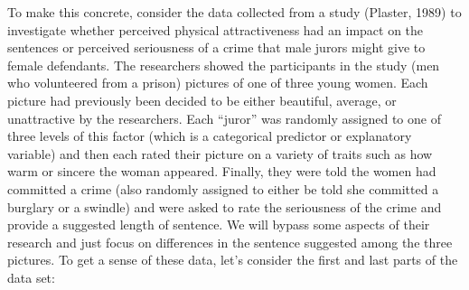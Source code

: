 \documentclass[]{book}
\begin{document}
To make this concrete, consider the data collected from a study
(Plaster, 1989) to investigate whether perceived physical attractiveness
had an impact on the sentences or perceived seriousness of a crime that
male jurors might give to female defendants. The researchers showed the
participants in the study (men who volunteered from a prison) pictures
of one of three young women. Each picture had previously been decided to
be either beautiful, average, or unattractive by the researchers. Each
``juror'' was randomly assigned to one of three levels of this factor
(which is a categorical predictor or explanatory variable) and then each
rated their picture on a variety of traits such as how warm or sincere
the woman appeared. Finally, they were told the women had committed a
crime (also randomly assigned to either be told she committed a burglary
or a swindle) and were asked to rate the seriousness of the crime and
provide a suggested length of sentence. We will bypass some aspects of
their research and just focus on differences in the sentence suggested
among the three pictures. To get a sense of these data, let's consider
the first and last parts of the data set:
\end{document}
